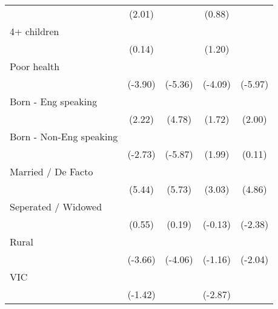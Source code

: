 {\begin{tabular}{l*{4}{c}}
                    &      (2.01)         &                     &      (0.88)         &                     \\
[1em]
4+ children         &                     &                     &                     &                     \\
                    &      (0.14)         &                     &      (1.20)         &                     \\
[1em]
Poor health         &            \sym{***}&            \sym{***}&            \sym{***}&            \sym{***}\\
                    &     (-3.90)         &     (-5.36)         &     (-4.09)         &     (-5.97)         \\
[1em]
Born - Eng speaking &            \sym{*}  &            \sym{***}&                     &            \sym{*}  \\
                    &      (2.22)         &      (4.78)         &      (1.72)         &      (2.00)         \\
[1em]
Born - Non-Eng speaking&            \sym{**} &            \sym{***}&            \sym{*}  &                     \\
                    &     (-2.73)         &     (-5.87)         &      (1.99)         &      (0.11)         \\
[1em]
Married / De Facto  &            \sym{***}&            \sym{***}&            \sym{**} &            \sym{***}\\
                    &      (5.44)         &      (5.73)         &      (3.03)         &      (4.86)         \\
[1em]
Seperated / Widowed &                     &                     &                     &            \sym{*}  \\
                    &      (0.55)         &      (0.19)         &     (-0.13)         &     (-2.38)         \\
[1em]
Rural               &            \sym{***}&            \sym{***}&                     &            \sym{*}  \\
                    &     (-3.66)         &     (-4.06)         &     (-1.16)         &     (-2.04)         \\
[1em]
VIC                 &                     &                     &            \sym{**} &                     \\
                    &     (-1.42)         &                     &     (-2.87)         &                     \\

\end{tabular}}
